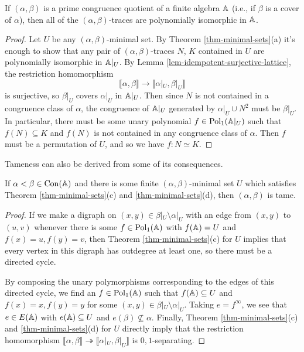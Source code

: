\begin{appendices}
\begin{prop}\label{prop-prime-poly-iso} If $(\alpha,\beta)$ is a prime congruence quotient of a finite algebra $\mathbb{A}$ (i.e., if $\beta$ is a cover of $\alpha$), then all of the $(\alpha,\beta)$-traces are polynomially isomorphic in $\mathbb{A}$.
\end{prop}
\begin{proof} Let $U$ be any $(\alpha,\beta)$-minimal set. By Theorem \ref{thm-minimal-sets}(a) it's enough to show that any pair of $(\alpha,\beta)$-traces $N$, $K$ contained in $U$ are polynomially isomorphic in $\mathbb{A}|_U$. By Lemma \ref{lem-idempotent-surjective-lattice}, the restriction homomorphism
\[
\llbracket \alpha, \beta \rrbracket \rightarrow \llbracket \alpha|_U, \beta|_U \rrbracket
\]
is surjective, so $\beta|_U$ covers $\alpha|_U$ in $\mathbb{A}|_U$. Then since $N$ is not contained in a congruence class of $\alpha$, the congruence of $\mathbb{A}|_U$ generated by $\alpha|_U \cup N^2$ must be $\beta|_U$. In particular, there must be some unary polynomial $f \in \operatorname{Pol}_1(\mathbb{A}|_U)$ such that $f(N) \subseteq K$ and $f(N)$ is not contained in any congruence class of $\alpha$. Then $f$ must be a permutation of $U$, and so we have $f : N \simeq K$.
\end{proof}

Tameness can also be derived from some of its consequences.

\begin{prop} If $\alpha < \beta \in \operatorname{Con}(\mathbb{A})$ and there is some finite $(\alpha,\beta)$-minimal set $U$ which satisfies Theorem \ref{thm-minimal-sets}(c) and \ref{thm-minimal-sets}(d), then $(\alpha,\beta)$ is tame.
\end{prop}
\begin{proof} If we make a digraph on $(x,y) \in \beta|_U\setminus\alpha|_U$ with an edge from $(x,y)$ to $(u,v)$ whenever there is some $f \in \operatorname{Pol}_1(\mathbb{A})$ with $f(\mathbb{A}) = U$ and $f(x) = u, f(y) = v$, then Theorem \ref{thm-minimal-sets}(c) for $U$ implies that every vertex in this digraph has outdegree at least one, so there must be a directed cycle.

By composing the unary polymorphisms corresponding to the edges of this directed cycle, we find an $f \in \operatorname{Pol}_1(\mathbb{A})$ such that $f(\mathbb{A}) \subseteq U$ and $f(x) = x, f(y) = y$ for some $(x,y) \in \beta|_U\setminus\alpha|_U$. Taking $e = f^\infty$, we see that $e \in E(\mathbb{A})$ with $e(\mathbb{A}) \subseteq U$ and $e(\beta) \not\subseteq \alpha$. Finally, Theorem \ref{thm-minimal-sets}(c) and \ref{thm-minimal-sets}(d) for $U$ directly imply that the restriction homomorphism $\llbracket \alpha, \beta \rrbracket \twoheadrightarrow \llbracket \alpha|_U, \beta|_U \rrbracket$ is $0,1$-separating.
\end{proof}


\end{appendices}
